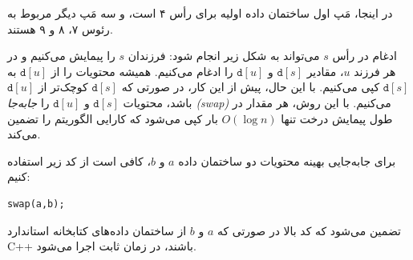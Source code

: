 \begin{center}
\end{center}

در اینجا، مَپ اول ساختمان داده اولیه
برای رأس ۴ است،
و سه مَپ دیگر مربوط به رئوس ۷، ۸ و ۹ هستند.

ادغام در رأس $s$ می‌تواند به شکل زیر انجام شود:
فرزندان $s$ را پیمایش می‌کنیم
و در هر فرزند $u$، مقادیر $\texttt{d}[s]$
و $\texttt{d}[u]$ را ادغام می‌کنیم.
همیشه محتویات را از $\texttt{d}[u]$
به $\texttt{d}[s]$ کپی می‌کنیم.
با این حال، پیش از این کار، در صورتی که $\texttt{d}[s]$ کوچک‌تر از $\texttt{d}[u]$ باشد،
محتویات $\texttt{d}[s]$ و $\texttt{d}[u]$ را \emph{جابه‌جا (swap)} می‌کنیم.
با این روش، هر مقدار در طول پیمایش درخت تنها $O(\log n)$
بار کپی می‌شود
که کارایی الگوریتم را تضمین می‌کند.

برای جابه‌جایی بهینه محتویات دو ساختمان داده $a$ و $b$،
کافی است از کد زیر استفاده کنیم:
\begin{lstlisting}
swap(a,b);
\end{lstlisting}
تضمین می‌شود که کد بالا در صورتی که $a$ و $b$ از ساختمان داده‌های کتابخانه استاندارد C++ باشند، در زمان ثابت اجرا می‌شود.

